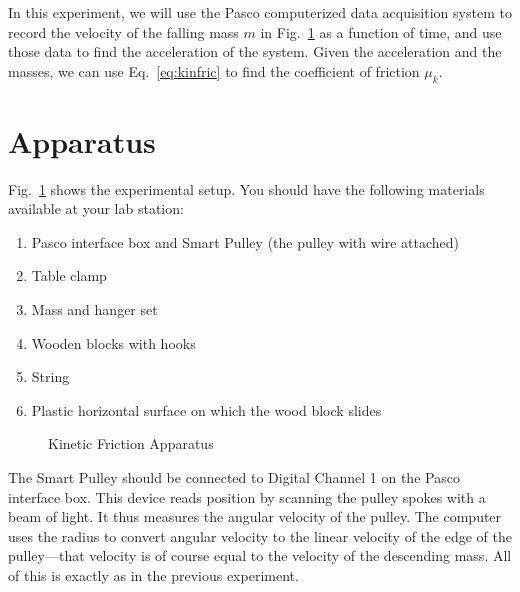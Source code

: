 In this experiment, we will use the Pasco computerized data
acquisition system to record the velocity of the falling mass $m$ in
Fig.~\ref{fig:kinetic} as a function of time, and use those data to
find the acceleration of the system.  Given the acceleration and the
masses, we can use Eq.~\ref{eq:kinfric} to find the coefficient of
friction $\mu_k$.

\section*{Apparatus}
Fig.~\ref{fig:kinetic} shows the experimental setup. You should have the following materials
available at your lab station:
\begin{enumerate}
\item Pasco interface box and Smart Pulley (the pulley with wire attached)
\item Table clamp
\item Mass and hanger set
\item Wooden blocks with hooks
\item String
\item Plastic horizontal surface on which the wood block slides
\end {enumerate}
\begin{figure}
\begin{center}
{}
\end{center}
 \caption{Kinetic Friction Apparatus  \label{fig:kinetic}}
\end{figure}
The Smart Pulley should be connected to Digital Channel 1 on the Pasco interface box.
This device reads position by scanning the pulley spokes with a beam
of light.  It thus measures the angular velocity of the pulley.  The
computer uses the radius to convert angular velocity to the linear
velocity of the edge of the pulley---that velocity is of course equal
to the velocity of the descending mass.  All of this is exactly as in
the previous experiment.

